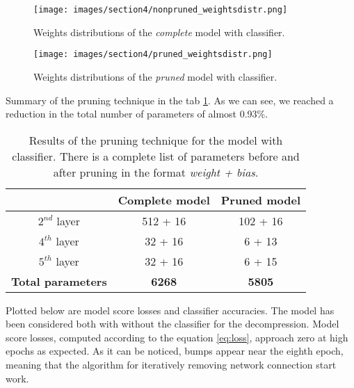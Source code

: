 \documentclass{article}
\begin{document}
\begin{figure}[H]
  \centering
  \texttt{[image: images/section4/nonpruned\_weightsdistr.png]}
  \caption{Weights distributions of the \textit{complete} model with classifier.}
  \label{fig:nonprun_weights}
\end{figure}

\begin{figure}[H]
  \centering
  \texttt{[image: images/section4/pruned\_weightsdistr.png]}
  \caption{Weights distributions of the \textit{pruned} model with classifier.}
  \label{fig:prun_weights}
\end{figure}



Summary of the pruning technique in the tab \ref{tab:params}. 
As we can see, we reached a reduction in the total number of parameters of almost 0.93\%.

\begin{table} [H]
  \centering
  \begin{tabular}{| c | c | c |}
  
  \hline
  & Complete model  &   Pruned model  \\
  \hline 
  \hline
  $2^{nd}$ layer & 512 + 16 & 102 + 16 \\ %
  \hline
  $4^{th}$ layer & 32 + 16 & 6 + 13 \\ %
  \hline
  $5^{th}$ layer & 32 + 16 & 6 + 15  \\ %
  \hline
  \textbf{Total parameters} & \textbf{6268} & \textbf{5805} \\
  \hline
  \end{tabular}
  \caption{Results of the pruning technique for the model with classifier.
  There is a complete list of parameters before and after pruning in the format \textit{weight + bias}.}
  \label{tab:params}
\end{table} 

Plotted below are model score losses and classifier accuracies. 
The model has been considered both with without the classifier for the decompression.
Model score losses, computed according to the equation \ref{eq:loss}, approach zero at high epochs as expected.
As it can be noticed, bumps appear near the eighth epoch, meaning that the algorithm for iteratively removing network connection start work.
\end{document}
